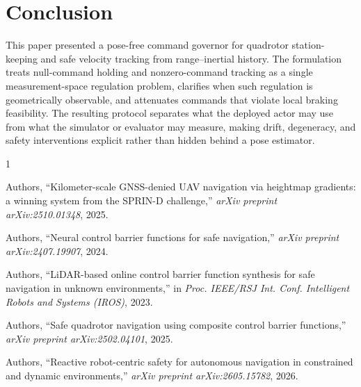 \documentclass[11pt]{article}
\begin{document}
\section{Conclusion}
\label{sec:conclusion}

This paper presented a pose-free command governor for quadrotor
station-keeping and safe velocity tracking from range--inertial history.  The
formulation treats null-command holding and nonzero-command tracking as a
single measurement-space regulation problem, clarifies when such regulation is
geometrically observable, and attenuates commands that violate local braking
feasibility.  The resulting protocol separates what the deployed actor may use
from what the simulator or evaluator may measure, making drift, degeneracy, and
safety interventions explicit rather than hidden behind a pose estimator.

\begin{thebibliography}{1}

Authors,
``Kilometer-scale GNSS-denied UAV navigation via heightmap gradients:
a winning system from the SPRIN-D challenge,''
\emph{arXiv preprint arXiv:2510.01348}, 2025.

Authors,
``Neural control barrier functions for safe navigation,''
\emph{arXiv preprint arXiv:2407.19907}, 2024.

Authors,
``LiDAR-based online control barrier function synthesis for safe navigation
in unknown environments,''
in \emph{Proc. IEEE/RSJ Int. Conf. Intelligent Robots and Systems (IROS)},
2023.

Authors,
``Safe quadrotor navigation using composite control barrier functions,''
\emph{arXiv preprint arXiv:2502.04101}, 2025.

Authors,
``Reactive robot-centric safety for autonomous navigation in constrained and
dynamic environments,''
\emph{arXiv preprint arXiv:2605.15782}, 2026.

\end{thebibliography}
\end{document}
